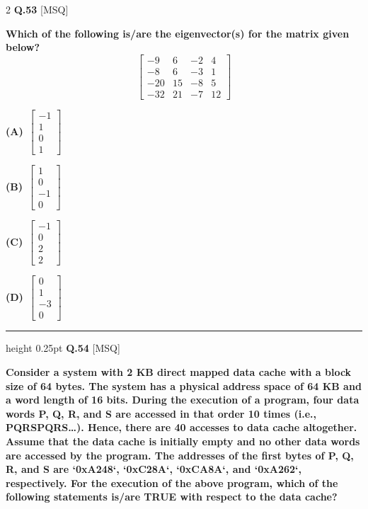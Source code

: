 \documentclass[a4paper,10pt,twoside]{article}
\begin{document}
\begin{multicols}{2}
\noindent\textbf{Q.53} \hfill {\footnotesize\textsf{[MSQ]}}
\par\vspace{2pt}
{\bfseries Which of the following is/are the eigenvector(s) for the matrix given below?
\[ \begin{bmatrix} -9 & 6 & -2 & 4 \\ -8 & 6 & -3 & 1 \\ -20 & 15 & -8 & 5 \\ -32 & 21 & -7 & 12 \end{bmatrix} \] \par}
\par\vspace{2pt}\noindent
\textbf{(A)}~$\begin{bmatrix} -1 \\ 1 \\ 0 \\ 1 \end{bmatrix}$\par\vspace{2pt}\noindent
\textbf{(B)}~$\begin{bmatrix} 1 \\ 0 \\ -1 \\ 0 \end{bmatrix}$\par\vspace{2pt}\noindent
\textbf{(C)}~$\begin{bmatrix} -1 \\ 0 \\ 2 \\ 2 \end{bmatrix}$\par\vspace{2pt}\noindent
\textbf{(D)}~$\begin{bmatrix} 0 \\ 1 \\ -3 \\ 0 \end{bmatrix}$
\par\vspace{6pt}\hrule height 0.25pt\vspace{6pt}
\noindent\textbf{Q.54} \hfill {\footnotesize\textsf{[MSQ]}}
\par\vspace{2pt}
{\bfseries Consider a system with 2 KB direct mapped data cache with a block size of 64 bytes. The system has a physical address space of 64 KB and a word length of 16 bits. During the execution of a program, four data words P, Q, R, and S are accessed in that order 10 times (i.e., PQRSPQRS\dots). Hence, there are 40 accesses to data cache altogether. Assume that the data cache is initially empty and no other data words are accessed by the program. The addresses of the first bytes of P, Q, R, and S are `0xA248`, `0xC28A`, `0xCA8A`, and `0xA262`, respectively. For the execution of the above program, which of the following statements is/are TRUE with respect to the data cache? \par}

\end{multicols}
\end{document}
